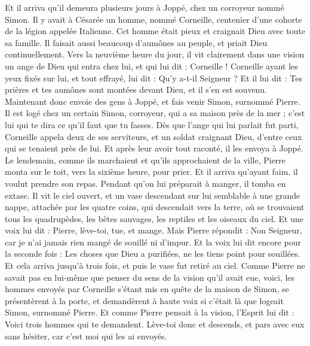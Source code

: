 \begin{multicols}{2}
{Et il arriva qu'il demeura plusieurs jours à Joppé, chez un corroyeur nommé Simon.
\VerseOne{}Il y avait à Césarée un homme, nommé Corneille, centenier d'une cohorte de la légion appelée Italienne.
Cet homme était pieux et craignait Dieu avec toute sa famille. Il faisait aussi beaucoup d'aumônes au peuple, et priait Dieu continuellement.
Vers la neuvième heure du jour, il vit clairement dans une vision un ange de Dieu qui entra chez lui, et qui lui dit : Corneille !
Corneille ayant les yeux fixés sur lui, et tout effrayé, lui dit : Qu'y a-t-il Seigneur ? Et il lui dit : Tes prières et tes aumônes sont montées devant Dieu, et il s'en est souvenu.
Maintenant donc envoie des gens à Joppé, et fais venir Simon, surnommé Pierre.
Il est logé chez un certain Simon, corroyeur, qui a sa maison près de la mer ; c'est lui qui te dira ce qu'il faut que tu fasses.
Dès que l'ange qui lui parlait fut parti, Corneille appela deux de ses serviteurs, et un soldat craignant Dieu, d'entre ceux qui se tenaient près de lui.
Et après leur avoir tout raconté, il les envoya à Joppé.
Le lendemain, comme ils marchaient et qu'ils approchaient de la ville, Pierre monta sur le toit, vers la sixième heure, pour prier.
Et il arriva qu'ayant faim, il voulut prendre son repas. Pendant qu'on lui préparait à manger, il tomba en extase.
Il vit le ciel ouvert, et un vase descendant sur lui semblable à une grande nappe, attachée par les quatre coins, qui descendait vers la terre,
où se trouvaient tous les quadrupèdes, les bêtes sauvages, les reptiles et les oiseaux du ciel.
Et une voix lui dit : Pierre, lève-toi, tue, et mange.
Mais Pierre répondit : Non Seigneur, car je n'ai jamais rien mangé de souillé ni d'impur.
Et la voix lui dit encore pour la seconde fois : Les choses que Dieu a purifiées, ne les tiens point pour souillées.
Et cela arriva jusqu'à trois fois, et puis le vase fut retiré au ciel.
Comme Pierre ne savait pas en lui-même que penser du sens de la vision qu'il avait eue, voici, les hommes envoyés par Corneille s'étant mis en quête de la maison de Simon, se présentèrent à la porte,
et demandèrent à haute voix si c'était là que logeait Simon, surnommé Pierre.
Et comme Pierre pensait à la vision, l'Esprit lui dit : Voici trois hommes qui te demandent.
Lève-toi donc et descends, et pars avec eux sans hésiter, car c'est moi qui les ai envoyés.
}
\end{multicols}
